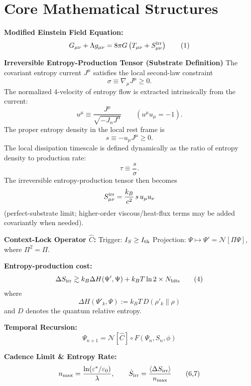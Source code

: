 \documentclass[11pt,letterpaper]{article}
\begin{document}
\section{Core Mathematical Structures}

\textbf{Modified Einstein Field Equation:}
\begin{equation}
G_{\mu\nu} + \Lambda g_{\mu\nu} = 8\pi G \left( T_{\mu\nu} + S_{\mu\nu}^{\rm irr} \right) \tag{1}
\end{equation}

\textbf{Irreversible Entropy-Production Tensor (Substrate Definition)}  
The covariant entropy current \(J^\mu\) satisfies the local second-law constraint
\[
\sigma \equiv \nabla_\mu J^\mu \geq 0.
\]
The normalized 4-velocity of entropy flow is extracted intrinsically from the current:
\[
u^\mu \equiv \frac{J^\mu}{\sqrt{-J_\alpha J^\alpha}} \qquad (u^\mu u_\mu = -1).
\]
The proper entropy density in the local rest frame is
\[
s \equiv -u_\mu J^\mu \geq 0.
\]
The local dissipation timescale is defined dynamically as the ratio of entropy density to production rate:
\[
\tau \equiv \frac{s}{\sigma}.
\]
The irreversible entropy-production tensor then becomes
\[
S_{\mu\nu}^{\rm irr} = \frac{k_B}{c^2} \, s \, u_\mu u_\nu
\]
(perfect-substrate limit; higher-order viscous/heat-flux terms may be added covariantly when needed).

\textbf{Context-Lock Operator \(\hat{C}\):}  
Trigger: \(I_S \geq I_{\rm th}\)  
Projection: \(\Psi \mapsto \Psi' = \mathcal{N}[\Pi \Psi]\), where \(\Pi^2 = \Pi\).

\textbf{Entropy-production cost:}
\begin{equation}
\Delta S_{\rm irr} \gtrsim k_B \Delta H(\Psi', \Psi) + k_B T \ln 2 \times N_{\rm bits} \tag{4}
\end{equation}
where
\[
\Delta H(\Psi'_k, \Psi) := k_B T \, D(\rho'_k \| \rho)
\]
and \(D\) denotes the quantum relative entropy.

\textbf{Temporal Recursion:}
\begin{equation}
\Psi_{n+1} = \mathcal{N}[\hat{C}] \circ F(\Psi_n, S_n, \phi) \tag{5}
\end{equation}

\textbf{Cadence Limit \& Entropy Rate:}
\begin{equation}
n_{\rm max} = \frac{\ln(\varepsilon^*/\varepsilon_0)}{\lambda}, \qquad \dot{S}_{\rm irr} = \frac{\langle \Delta S_{\rm irr} \rangle}{n_{\rm max}} \tag{6,7}
\end{equation}
\end{document}

